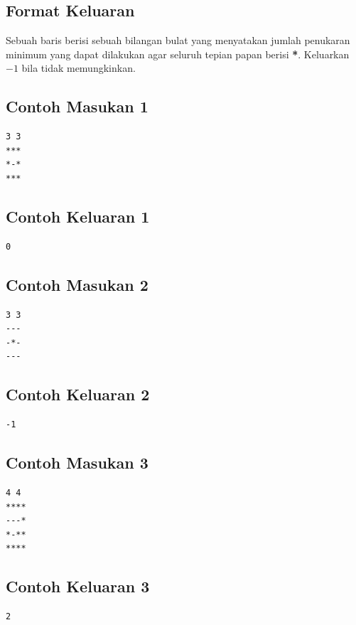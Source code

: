 \documentclass{article}
\begin{document}
\subsection*{Format Keluaran}
Sebuah baris berisi sebuah bilangan bulat yang menyatakan jumlah penukaran minimum yang dapat dilakukan agar seluruh tepian papan berisi \textbf{*}. Keluarkan $-1$ bila tidak memungkinkan.

\begin{multicols}{2}
\subsection*{Contoh Masukan 1}
\begin{lstlisting}
3 3
***
*-*
***
\end{lstlisting}
\columnbreak

\subsection*{Contoh Keluaran 1}
\begin{lstlisting}
0
\end{lstlisting}
\vfill
\null
\end{multicols}

\begin{multicols}{2}
\subsection*{Contoh Masukan 2}
\begin{lstlisting}
3 3
---
-*-
---
\end{lstlisting}
\columnbreak

\subsection*{Contoh Keluaran 2}
\begin{lstlisting}
-1
\end{lstlisting}
\vfill
\null
\end{multicols}

\begin{multicols}{2}
\subsection*{Contoh Masukan 3}
\begin{lstlisting}
4 4
****
---*
*-**
****
\end{lstlisting}
\columnbreak

\subsection*{Contoh Keluaran 3}
\begin{lstlisting}
2
\end{lstlisting}
\vfill
\null
\end{multicols}
\end{document}

